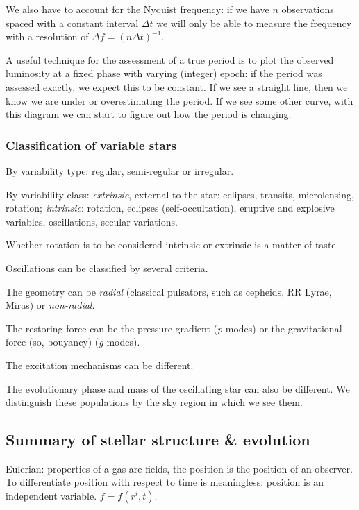 \documentclass[main.tex]{subfiles}
\begin{document}
We also have to account for the Nyquist frequency: if we have \(n\) observations spaced with a constant interval \(\Delta t\) we will only be able to measure the frequency with a resolution of \(\Delta f = (n \Delta t)^{-1}\). 

A useful technique for the assessment of a true period is to plot the observed luminosity at a fixed phase with varying (integer) epoch: if the period was assessed exactly, we expect this to be constant. 
If we see a straight line, then we know we are under or overestimating the period. If we see some other curve, with this diagram we can start to figure out how the period is changing. 

\subsubsection{Classification of variable stars}

By variability type: regular, semi-regular or irregular.

By variability class: \emph{extrinsic}, external to the star: eclipses, transits, microlensing, rotation; \emph{intrinsic}: rotation, eclipses (self-occultation), eruptive and explosive variables, oscillations, secular variations.

Whether rotation is to be considered intrinsic or extrinsic is a matter of taste.

Oscillations can be classified by several criteria.

The geometry can be \emph{radial} (classical pulsators, such as cepheids, RR Lyrae, Miras) or \emph{non-radial}.

The restoring force can be the pressure gradient (\emph{p}-modes) or the gravitational force (so, bouyancy) (\emph{g}-modes).

The excitation mechanisms can be different.

The evolutionary phase and mass of the oscillating star can also be different. We distinguish these populations by the sky region in which we see them. 

\subsection{Summary of stellar structure \& evolution}


Eulerian: properties of a gas are fields, the position is the position of an observer.
To differentiate position with respect to time is meaningless: position is an independent variable. \(f = f(r^i, t)\).
\end{document}
